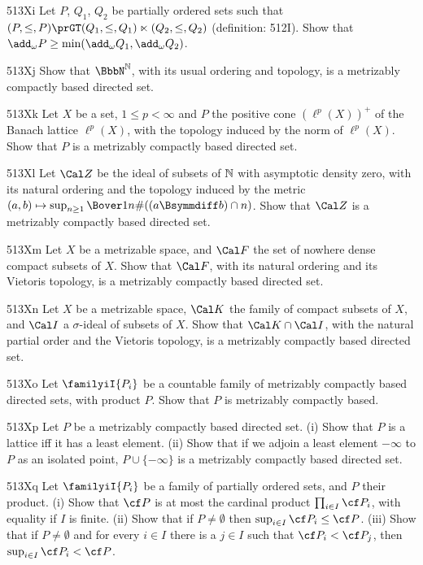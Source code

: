 {\spheader 513Xi Let $P$, $Q_1$, $Q_2$ be partially ordered sets such
that $(P,\le,P)\prGT(Q_1,\le,Q_1)\ltimes(Q_2,\le\nobreak,Q_2)$ (definition:
512I).   Show that
$\add_{\omega}P\ge\min(\add_{\omega}Q_1,\add_{\omega}Q_2)$.

\spheader 513Xj Show that $\BbbN^{\Bbb N}$, with its usual ordering and
topology, is a metrizably compactly based directed set.

\spheader 513Xk Let $X$ be a set, $1\le p<\infty$ and $P$ the positive cone
$(\ell^p(X))^+$ of the Banach lattice $\ell^p(X)$, with the topology
induced by the norm of $\ell^p(X)$.   Show that $P$ is a metrizably
compactly based directed set.

\spheader 513Xl Let $\Cal Z$ be the ideal of subsets of $\Bbb N$ with
asymptotic density zero, with its natural ordering and the topology
induced by the metric
$(a,b)\mapsto\sup_{n\ge 1}\Bover1n\#((a\Bsymmdiff b)\cap n)$.   Show
that $\Cal Z$ is a metrizably compactly based directed set.

\spheader 513Xm Let $X$ be a metrizable space, and
$\Cal F$ the set of nowhere dense compact subsets of $X$.   Show that
$\Cal F$, with its natural ordering and its Vietoris topology, is a
metrizably compactly based directed set.   

\spheader 513Xn Let $X$ be a metrizable space, $\Cal K$ the family
of compact subsets of $X$, and $\Cal I$ a $\sigma$-ideal of subsets of
$X$.   Show that $\Cal K\cap\Cal I$, with the natural partial order and
the Vietoris topology, is a metrizably compactly based directed set.

\spheader 513Xo Let $\familyiI{P_i}$ be a countable family of metrizably
compactly based directed sets, with product $P$.
Show that $P$ is metrizably compactly based.

\spheader 513Xp Let $P$ be a metrizably compactly based directed set.
(i) Show that $P$ is a lattice iff it has a least element.   (ii) Show
that if we adjoin a least element $-\infty$ to $P$ as an isolated point,
$P\cup\{-\infty\}$ is a metrizably compactly based directed set.

\spheader 513Xq
Let $\familyiI{P_i}$ be a family of partially ordered
sets, and $P$ their product.
(i) Show that $\cf P$ is at most the cardinal
product $\prod_{i\in I}\cf P_i$, with equality if $I$ is finite.
(ii) Show that if $P\ne\emptyset$ then $\sup_{i\in I}\cf P_i\le\cf P$.
(iii) Show that if $P\ne\emptyset$ and for every $i\in I$ there is a
$j\in I$ such that $\cf P_i<\cf P_j$, then $\sup_{i\in I}\cf P_i<\cf P$.

}
